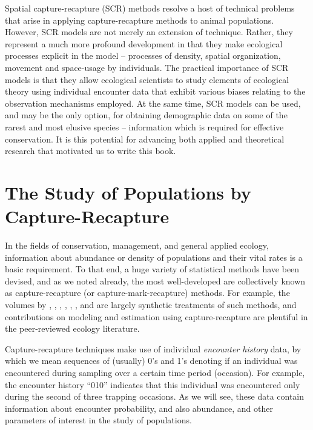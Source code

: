Spatial capture-recapture (SCR) methods resolve a host of technical
problems that arise in applying capture-recapture methods to animal
populations.  However, SCR models are not merely an extension of
technique. Rather, they represent a much more profound development in
that they make ecological processes explicit in the model -- processes
of density, spatial organization, movement and space-usage by
individuals.  The practical importance of SCR models is that they
allow ecological scientists to study elements of ecological theory
using individual encounter data that exhibit various biases relating
to the observation mechanisms
employed. 
At the same time, SCR models can be used, and may be the only option,
for obtaining demographic data on some of the rarest and most elusive
species -- information which is required for effective conservation.
It is this potential for advancing both applied and theoretical
research that motivated us to write this book.



\section{The Study of Populations by Capture-Recapture}

In the fields of conservation, management, and general applied ecology,
information about abundance or density of populations and their vital
rates is a basic requirement.  To
that end, a huge variety of statistical methods have been devised, and
as we noted already, the most well-developed are collectively known as
capture-recapture (or capture-mark-recapture) methods. For example,
the volumes by \citet{otis_etal:1978}, \citet{white_etal:1982},
\citet{seber:1982}, \citet{pollock_etal:1990},
\citet{borchers_etal:2002}, \citet{williams_etal:2002}, and
\citet{amstrup_etal:2005} are largely synthetic treatments of such
methods, and contributions on modeling and estimation using
capture-recapture are plentiful in the peer-reviewed ecology
literature.


Capture-recapture techniques make use of individual {\it encounter
  history} data, by which we mean sequences of (usually) 0's and 1's
denoting if an individual was encountered during sampling over a
certain time period (occasion). For example, the encounter history ``010''
indicates that this individual was encountered only during the second
of three trapping occasions. As we will see, these data contain
information about encounter probability, and also abundance, and other
parameters of interest in the study of populations.

